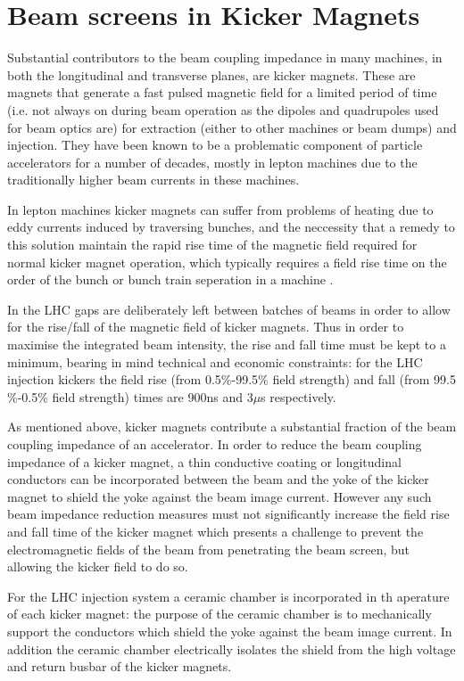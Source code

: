 \section{Beam screens in Kicker Magnets}
\label{sec:beam_screens}

Substantial contributors to the beam coupling impedance in many machines, in both the longitudinal and transverse planes, are kicker magnets. These are magnets that generate a fast pulsed magnetic field for a limited period of time (i.e. not always on during beam operation as the dipoles and quadrupoles used for beam optics are) for extraction (either to other machines or beam dumps) and injection. They have been known to be a problematic component of particle accelerators for a number of decades, mostly in lepton machines due to the traditionally higher beam currents in these machines.

In lepton machines kicker magnets can suffer from problems of heating due to eddy currents induced by traversing bunches, and the neccessity that a remedy to this solution maintain the rapid rise time of the magnetic field required for normal kicker magnet operation, which typically requires a field rise time on the order of the bunch or bunch train seperation in a machine \cite{Caspers:ThinCondLayers}. 

In the LHC gaps are deliberately left between batches of beams in order to allow for the rise/fall of the magnetic field of kicker magnets. Thus in order to maximise the integrated beam intensity, the rise and fall time must be kept to a minimum, bearing in mind technical and economic constraints: for the LHC injection kickers the field rise (from 0.5$\%$-99.5$\%$ field strength) and fall (from 99.5$\%$-0.5$\%$ field strength) times are 900ns and 3$\mu$s respectively.

As mentioned above, kicker magnets contribute a substantial fraction of the beam coupling impedance of an accelerator. In order to reduce the beam coupling impedance of a kicker magnet, a thin conductive coating or longitudinal conductors can be incorporated between the beam and the yoke of the kicker magnet to shield the yoke against the beam image current. However any such beam impedance reduction measures must not significantly increase the field rise and fall time of the kicker magnet which presents a challenge to prevent the electromagnetic fields of the beam from penetrating the beam screen, but allowing the kicker field to do so.

For the LHC injection system a ceramic chamber is incorporated in th aperature of each kicker magnet: the purpose of the ceramic chamber is to mechanically support the conductors which shield the yoke against the beam image current. In addition the ceramic chamber electrically isolates the shield from the high voltage and return busbar of the kicker magnets.

